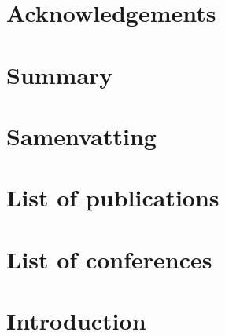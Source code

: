 \onehalfspacing

\allsectionsfont{\sffamily}
\newcommand{\ra}[1]{\renewcommand{\arraystretch}{#1}}

\let\Oldpart\part
\newcommand{\parttitle}{}
\renewcommand{\part}[1]{\Oldpart{#1}\renewcommand{\parttitle}{#1}}

\renewcommand{\chaptermark}[1]{\markboth{\textsf{Part \thepart.~ \parttitle}}{}}
\renewcommand{\sectionmark}[1]{\markright{\textsf{\thechapter.~ chapter title}}}

\hypertarget{acknowledgements}{%
\chapter*{Acknowledgements}\label{acknowledgements}}

\hypertarget{summary}{%
\chapter*{Summary}\label{summary}}

\hypertarget{samenvatting}{%
\chapter*{Samenvatting}\label{samenvatting}}

\hypertarget{list-of-publications}{%
\chapter*{List of publications}\label{list-of-publications}}

\hypertarget{list-of-conferences}{%
\chapter*{List of conferences}\label{list-of-conferences}}

\mainmatter

\hypertarget{introduction}{%
\chapter{Introduction}\label{introduction}}

